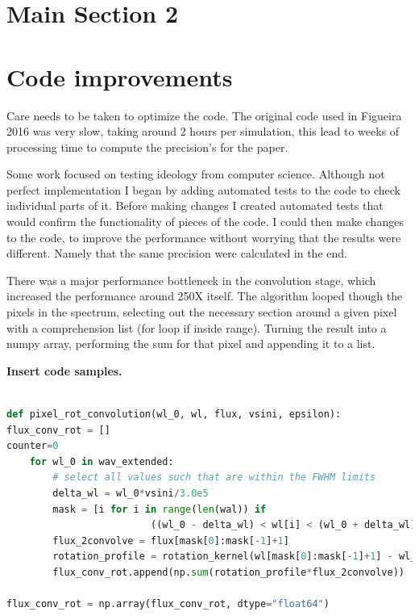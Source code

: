 
\section{Main Section 2}



\section{Code improvements}
Care needs to be taken to optimize the code. The original code used in Figueira 2016 was very slow, taking around 2 hours per simulation, this lead to weeks of processing time to compute the precision's for the paper.

Some work focused on testing ideology from computer science. Although not perfect implementation I began by adding automated tests to the code to check individual parts of it.
Before making changes I created automated tests that would confirm the functionality of pieces of the code. I could then make changes to the code, to improve the performance without worrying that the results were different.
Namely that the same precision were calculated in the end.

There was a major performance bottleneck in the convolution stage, which increased the performance around 250X itself. The algorithm looped though the pixels in the spectrum, selecting out the necessary section around a given pixel with a comprehension list (for loop if inside range). Turning the result into a numpy array, performing the sum for that pixel and appending it to a list.

\textbf{Insert code samples.}

\begin{lstlisting}[language=Python, caption=Python example old]

def pixel_rot_convolution(wl_0, wl, flux, vsini, epsilon):
flux_conv_rot = []
counter=0
    for wl_0 in wav_extended:
        # select all values such that are within the FWHM limits
        delta_wl = wl_0*vsini/3.0e5
        mask = [i for i in range(len(wal)) if
                         ((wl_0 - delta_wl) < wl[i] < (wl_0 + delta_wl))]
        flux_2convolve = flux[mask[0]:mask[-1]+1]
        rotation_profile = rotation_kernel(wl[mask[0]:mask[-1]+1] - wl_0, delta_wl, vsini, epsilon)
        flux_conv_rot.append(np.sum(rotation_profile*flux_2convolve))

flux_conv_rot = np.array(flux_conv_rot, dtype="float64")

\end{lstlisting}

